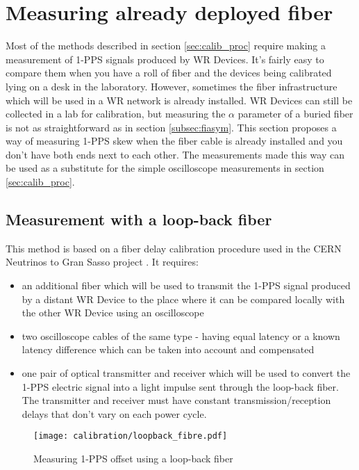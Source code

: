\section{Measuring already deployed fiber}

Most of the methods described in section \ref{sec:calib_proc} require making a
measurement of 1-PPS signals produced by WR Devices. It's fairly easy to compare
them when you have a roll of fiber and the devices being calibrated lying on a
desk in the laboratory. However, sometimes the fiber infrastructure which
will be used in a WR network is already installed. WR Devices can still be
collected in a lab for calibration, but measuring the $\alpha$ parameter of a
buried fiber is not as straightforward as in section \ref{subsec:fiasym}. This
section proposes a way of measuring 1-PPS skew when the fiber cable is
already installed and you don't have both ends next to each other. The
measurements made this way can be used as a substitute for the simple
oscilloscope measurements in section \ref{sec:calib_proc}.

\subsection{Measurement with a loop-back fiber}
\label{subsec:loopback}
This method is based on a fiber delay calibration procedure used in the CERN
Neutrinos to Gran Sasso project \cite{cngs}. It requires:
\begin{itemize}
	\item an additional fiber which will be used to transmit the 1-PPS signal
		produced by a distant WR Device to the place where it can be compared
		locally with the other WR Device using an oscilloscope
	\item two oscilloscope cables of the same type - having equal latency or a
    known latency difference which can be taken into account and compensated
	\item one pair of optical transmitter and receiver which will be used to
		convert the 1-PPS electric signal into a light impulse sent through the
		loop-back fiber. The transmitter and receiver must have constant
		transmission/reception delays that don't vary on each power cycle.
\end{itemize}

\begin{figure}[ht]
	\begin{center}
	\texttt{[image: calibration/loopback\_fibre.pdf]}
	\caption{Measuring 1-PPS offset using a loop-back fiber}
	\label{fig:loopback}
	\end{center}
\end{figure}

